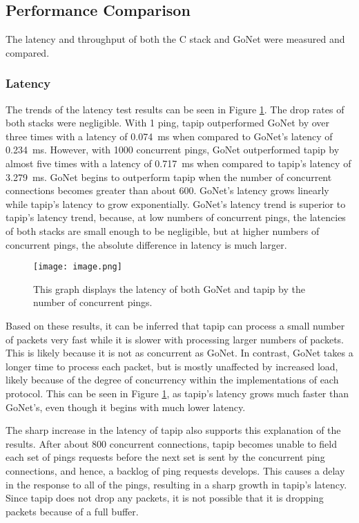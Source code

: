 \documentclass[twocolumn,10pt]{article}
\begin{document}
\subsection{Performance Comparison}
The latency and throughput of both the C stack and GoNet were measured and compared.

\subsubsection{Latency}
The trends of the latency test results can be seen in Figure \ref{fig:latency}. The drop rates of both stacks were negligible. With 1 ping, tapip outperformed GoNet by over three times with a latency of 0.074~ms when compared to GoNet's latency of 0.234~ms. However, with 1000 concurrent pings, GoNet outperformed tapip by almost five times with a latency of 0.717~ms when compared to tapip's latency of 3.279~ms. GoNet begins to outperform tapip when the number of concurrent connections becomes greater than about 600. GoNet's latency grows linearly while tapip's latency to grow exponentially. GoNet's latency trend is superior to tapip's latency trend, because, at low numbers of concurrent pings, the latencies of both stacks are small enough to be negligible, but at higher numbers of concurrent pings, the absolute difference in latency is much larger.

\begin{figure}[hb]
\begin{center}
\texttt{[image: image.png]}
  \caption{This graph displays the latency of both GoNet and tapip by the number of concurrent pings.}
  \label{fig:latency}
\end{center}
\end{figure}

Based on these results, it can be inferred that tapip can process a small number of packets very fast while it is slower with processing larger numbers of packets. This is likely because it is not as concurrent as GoNet. In contrast, GoNet takes a longer time to process each packet, but is mostly unaffected by increased load, likely because of the degree of concurrency within the implementations of each protocol. This can be seen in Figure \ref{fig:latency}, as tapip's latency grows much faster than GoNet's, even though it begins with much lower latency.

The sharp increase in the latency of tapip also supports this explanation of the results. After about 800 concurrent connections, tapip becomes unable to field each set of pings requests before the next set is sent by the concurrent ping connections, and hence, a backlog of ping requests develops. This causes a delay in the response to all of the pings, resulting in a sharp growth in tapip's latency. Since tapip does not drop any packets, it is not possible that it is dropping packets because of a full buffer. 
\end{document}
